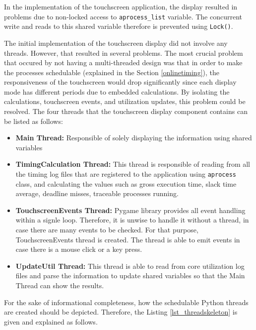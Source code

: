 In the implementation of the touchscreen application, the display resulted in problems due to non-locked access to \texttt{aprocess{\_}list} variable. The concurrent write and reads to this shared variable therefore is prevented using \texttt{Lock()}.

The initial implementation of the touchscreen display did not involve any threads. However, that resulted in several problems. The most crucial problem that occured by not having a multi-threaded design was that in order to make the processes schedulable (explained in the Section \ref{onlinetiming}), the responsiveness of the touchscreen would drop significantly since each display mode has different periods due to embedded calculations. By isolating the calculations, touchscreen events, and utilization updates, this problem could be resolved. The four threads that the touchscreen display component contains can be listed as follows:

\begin{itemize}
	\item \textbf{Main Thread:} Responsible of solely displaying the information using shared variables
	\item \textbf{TimingCalculation Thread:} This thread is responsible of reading from all the timing log files that are registered to the application using \texttt{aprocess} class, and calculating the values such as gross execution time, slack time average, deadline misses, traceable processes running.
	\item \textbf{TouchscreenEvents Thread:} Pygame library provides all event handling within a signle loop. Therefore, it is unwise to handle it without a thread, in case there are many events to be checked. For that purpose, TouchscreenEvents thread is created. The thread is able to emit events in case there is a mouse click or a key press.
	\item \textbf{UpdateUtil Thread:} This thread is able to read from core utilization log files and parse the information to update shared variables so that the Main Thread can show the results.
\end{itemize}

For the sake of informational completeness, how the schedulable Python threads are created should be depicted. Therefore, the Listing  \ref{lst_threadskeleton} is given and explained as follows.



